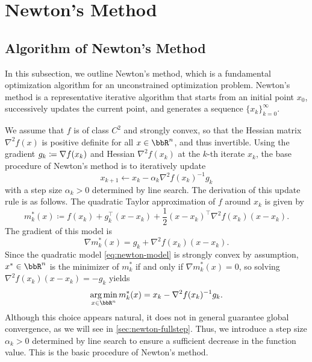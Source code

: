 \documentclass[en]{subfiles}
\begin{document}
\section{Newton's Method}\label{sec:background_newton}

\subsection{Algorithm of Newton's Method}

In this subsection, we outline Newton's method, which is a fundamental optimization algorithm for an unconstrained optimization problem.
Newton's method is a representative iterative algorithm that starts from an initial point $x_0$, successively updates the current point, and generates a sequence $\{x_k\}_{k=0}^\infty$.

We assume that $f$ is of class $C^2$ and strongly convex, so that the Hessian matrix $\nabla^2 f(x)$ is positive definite for all $x \in \bbR^n$, and thus invertible.
Using the gradient $g_k \coloneqq \nabla f(x_k)$ and Hessian $\nabla^2 f(x_k)$ at the $k$-th iterate $x_k$, the base procedure of Newton's method is to iteratively update
\begin{equation*}
    x_{k+1} \gets x_k - \alpha_k \nabla^2 f(x_k)^{-1} g_k
\end{equation*}
with a step size $\alpha_k > 0$ determined by line search.
The derivation of this update rule is as follows.
The quadratic Taylor approximation of $f$ around $x_k$ is given by
\begin{equation}\label{eq:newton-model}
    m^*_{k}(x) \coloneqq f(x_k) + g_k^\top (x - x_k) + \frac{1}{2} (x - x_k)^\top \nabla^2 f(x_k) (x - x_k).
\end{equation}
The gradient of this model is
\begin{equation}\label{eq:newton-model-gradient}
    \nabla m^*_k(x) = g_k + \nabla^2 f(x_k)(x - x_k).
\end{equation}
Since the quadratic model \cref{eq:newton-model} is strongly convex by assumption, $x^* \in \bbR^n$ is the minimizer of $m^*_k$ if and only if $\nabla m^*_k(x) = 0$, so solving $\nabla^2 f(x_k)(x - x_k) = -g_k$ yields
\begin{equation*}
    \argmin_{x\in\bbR^n} m^*_{k}(x) = x_k -\nabla^2 f(x_k)^{-1} g_k.
\end{equation*}
Although this choice appears natural, it does not in general guarantee global convergence, as we will see in \cref{sec:newton-fullstep}.
Thus, we introduce a step size $\alpha_k > 0$ determined by line search to ensure a sufficient decrease in the function value.
This is the basic procedure of Newton's method.
\end{document}
